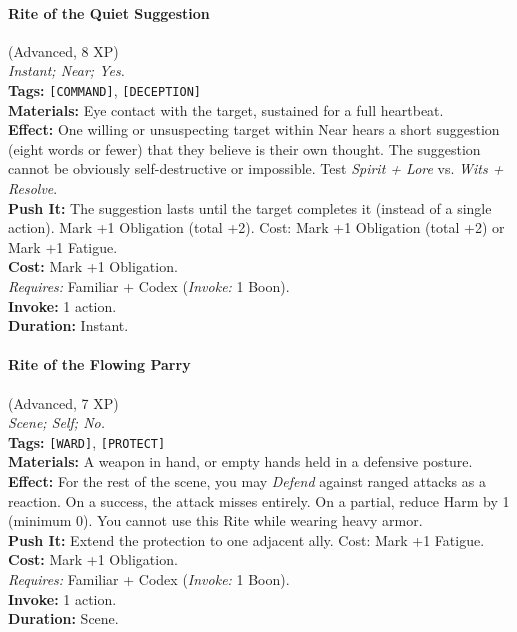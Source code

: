 \paragraph{Rite of the Quiet Suggestion} (Advanced, 8 XP) \hfill \\
\emph{Instant; Near; Yes.} \\
\textbf{Tags:} \texttt{[COMMAND]}, \texttt{[DECEPTION]} \\
\textbf{Materials:} Eye contact with the target, sustained for a full heartbeat. \\
\textbf{Effect:} One willing or unsuspecting target within Near hears a short suggestion (eight words or fewer) that they believe is their own thought. The suggestion cannot be obviously self-destructive or impossible. Test \textit{Spirit + Lore} vs. \textit{Wits + Resolve}. \\
\textbf{Push It:} The suggestion lasts until the target completes it (instead of a single action). Mark +1 Obligation (total +2). Cost: Mark +1 Obligation (total +2) or Mark +1 Fatigue. \\
\textbf{Cost:} Mark +1 Obligation. \\
\textit{Requires:} Familiar + Codex (\textit{Invoke:} 1 Boon). \\
\textbf{Invoke:} 1 action. \\
\textbf{Duration:} Instant.

\paragraph{Rite of the Flowing Parry} (Advanced, 7 XP) \hfill \\
\emph{Scene; Self; No.} \\
\textbf{Tags:} \texttt{[WARD]}, \texttt{[PROTECT]} \\
\textbf{Materials:} A weapon in hand, or empty hands held in a defensive posture. \\
\textbf{Effect:} For the rest of the scene, you may \textit{Defend} against ranged attacks as a reaction. On a success, the attack misses entirely. On a partial, reduce Harm by 1 (minimum 0). You cannot use this Rite while wearing heavy armor. \\
\textbf{Push It:} Extend the protection to one adjacent ally. Cost: Mark +1 Fatigue. \\
\textbf{Cost:} Mark +1 Obligation. \\
\textit{Requires:} Familiar + Codex (\textit{Invoke:} 1 Boon). \\
\textbf{Invoke:} 1 action. \\
\textbf{Duration:} Scene.

